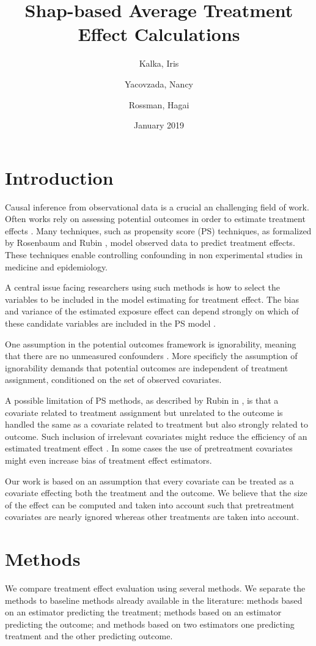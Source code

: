 \documentclass{article}
\title{Shap-based Average Treatment Effect Calculations}
\author{Kalka, Iris
        \and
        Yacovzada, Nancy
        \and
        Rossman, Hagai}
\date{January 2019}
\begin{document}
\maketitle

\section{Introduction}
Causal inference from observational data is a crucial an challenging field of work. Often works rely on assessing potential outcomes in order to estimate treatment effects \cite{neyman1923application}\cite{rubin1974estimating}. Many techniques, such as propensity score (PS) techniques, as formalized by Rosenbaum and Rubin \cite{rosenbaum1983central}, model observed data to predict treatment effects. These techniques enable  controlling confounding in non experimental studies in medicine and epidemiology. 

A central issue facing researchers using such methods is how to select the variables to be included in the model estimating for treatment effect. The bias and variance of the estimated exposure effect can depend strongly on which of these candidate variables are included in the PS model \cite{brookhart2006variable}.

One assumption in the potential outcomes framework is ignorability, meaning that there are no unmeasured confounders \cite{rosenbaum1983central}. More specificly the assumption of ignorability demands that potential outcomes are independent of treatment assignment, conditioned on the set of observed covariates.

A possible limitation of PS methods, as described by Rubin in \cite{rubin1997estimating}, is that a covariate related to treatment assignment but unrelated to the outcome is handled the same as a covariate related to treatment but also strongly related to outcome. Such inclusion of irrelevant covariates might reduce the efficiency of an estimated treatment effect \cite{10.1093/biomet/asx009}. In some cases the use of pretreatment covariates might even increase bias of treatment effect estimators.

Our work is based on an assumption that every covariate can be treated as a covariate effecting both the treatment and the outcome. We believe that the size of the effect can be computed and taken into account such that pretreatment covariates are nearly ignored whereas other treatments are taken into account. 


\section{Methods}
We compare treatment effect evaluation using several methods. We separate the methods to baseline methods already available in the literature: methods based on an estimator predicting the treatment; methods based on an estimator predicting the outcome; and methods based on two estimators one predicting treatment and the other predicting outcome.
\end{document}
